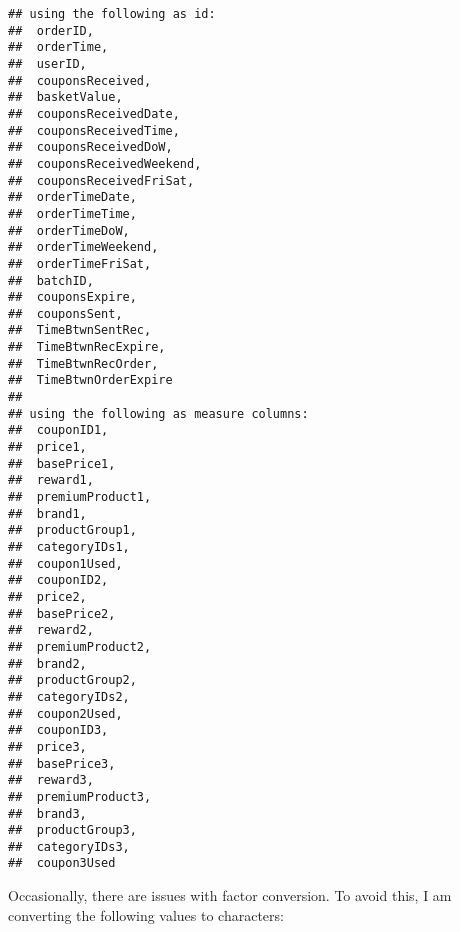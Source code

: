 \documentclass[10pt]{report}
\newenvironment{Shaded}{}{}
\newcommand{\KeywordTok}[1]{\textcolor[rgb]{0.00,0.44,0.13}{\textbf{{#1}}}}
\newcommand{\DataTypeTok}[1]{\textcolor[rgb]{0.56,0.13,0.00}{{#1}}}
\newcommand{\StringTok}[1]{\textcolor[rgb]{0.25,0.44,0.63}{{#1}}}
\newcommand{\NormalTok}[1]{{#1}}
\begin{document}
\begin{Shaded}
\end{Shaded}

\begin{verbatim}
## using the following as id:
##  orderID,
##  orderTime,
##  userID,
##  couponsReceived,
##  basketValue,
##  couponsReceivedDate,
##  couponsReceivedTime,
##  couponsReceivedDoW,
##  couponsReceivedWeekend,
##  couponsReceivedFriSat,
##  orderTimeDate,
##  orderTimeTime,
##  orderTimeDoW,
##  orderTimeWeekend,
##  orderTimeFriSat,
##  batchID,
##  couponsExpire,
##  couponsSent,
##  TimeBtwnSentRec,
##  TimeBtwnRecExpire,
##  TimeBtwnRecOrder,
##  TimeBtwnOrderExpire
## 
## using the following as measure columns:
##  couponID1,
##  price1,
##  basePrice1,
##  reward1,
##  premiumProduct1,
##  brand1,
##  productGroup1,
##  categoryIDs1,
##  coupon1Used,
##  couponID2,
##  price2,
##  basePrice2,
##  reward2,
##  premiumProduct2,
##  brand2,
##  productGroup2,
##  categoryIDs2,
##  coupon2Used,
##  couponID3,
##  price3,
##  basePrice3,
##  reward3,
##  premiumProduct3,
##  brand3,
##  productGroup3,
##  categoryIDs3,
##  coupon3Used
\end{verbatim}

Occasionally, there are issues with factor conversion. To avoid this, I
am converting the following values to characters:
\end{document}
